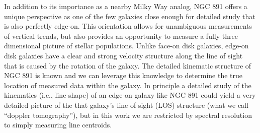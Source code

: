 






In addition to its importance as a nearby Milky Way analog, NGC 891
offers a unique perspective as one of the few galaxies close enough
for detailed study that is also perfectly edge-on. This orientation
allows for unambiguous measurements of vertical trends, but also
provides an opportunity to measure a fully three dimensional picture
of stellar populations. Unlike face-on disk galaxies, edge-on disk
galaxies have a clear and strong velocity structure along the line of
sight that is caused by the rotation of the galaxy. The detailed
kinematic structure of NGC 891 is known
\citep{Swaters97,Kregel05,Oosterloo07} and we can leverage this
knowledge to determine the true location of measured data within the
galaxy. In principle a detailed study of the kinematics (i.e., line
shape) of an edge-on galaxy like NGC 891 could yield a very detailed
picture of the that galaxy's line of sight (LOS) structure (what we
call ``doppler tomography''), but in this work we are restricted by
spectral resolution to simply measuring line centroids.

